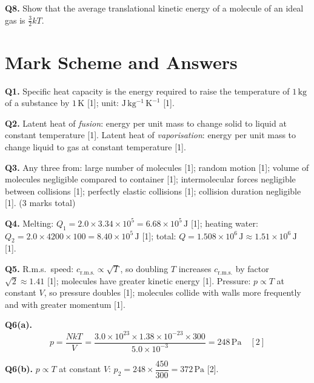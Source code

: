 \bigskip
\noindent\begin{minipage}{\textwidth}
\textbf{Q8.} Show that the average translational kinetic energy of a molecule of an
ideal gas is $\tfrac{3}{2}kT$.
\end{minipage}

\newpage
\section{Mark Scheme and Answers}

\begin{markbox}
\textbf{Q1.} Specific heat capacity is the energy required to raise the temperature of
$1\,\mathrm{kg}$ of a substance by $1\,\mathrm{K}$ [1];\quad
unit: $\mathrm{J\,kg^{-1}\,K^{-1}}$ [1].

\medskip
\textbf{Q2.} Latent heat of \emph{fusion}: energy per unit mass to change solid to
liquid at constant temperature [1]. Latent heat of \emph{vaporisation}: energy per
unit mass to change liquid to gas at constant temperature [1].

\medskip
\textbf{Q3.} Any three from: large number of molecules [1]; random motion [1]; volume
of molecules negligible compared to container [1]; intermolecular forces negligible
between collisions [1]; perfectly elastic collisions [1]; collision duration negligible
[1]. \quad(3 marks total)

\medskip
\textbf{Q4.}
Melting: $Q_1 = 2.0 \times 3.34\times10^5 = 6.68\times10^5\,\mathrm{J}$ [1];
heating water: $Q_2 = 2.0 \times 4200 \times 100 = 8.40\times10^5\,\mathrm{J}$ [1];
total: $Q = 1.508\times10^6\,\mathrm{J} \approx 1.51\times10^6\,\mathrm{J}$ [1].

\medskip
\textbf{Q5.}
R.m.s.\ speed: $c_{\mathrm{r.m.s.}} \propto \sqrt{T}$, so doubling $T$ increases
$c_{\mathrm{r.m.s.}}$ by factor $\sqrt{2} \approx 1.41$ [1]; molecules have greater
kinetic energy [1].
Pressure: $p \propto T$ at constant $V$, so pressure doubles [1]; molecules collide
with walls more frequently and with greater momentum [1].

\medskip
\textbf{Q6(a).}
\[
  p = \frac{NkT}{V}
    = \frac{3.0\times10^{23} \times 1.38\times10^{-23} \times 300}{5.0\times10^{-3}}
    = 248\,\mathrm{Pa} \quad [2]
\]

\textbf{Q6(b).}
$p \propto T$ at constant $V$:\quad
$p_2 = 248 \times \dfrac{450}{300} = 372\,\mathrm{Pa}$ [2].


\end{markbox}
